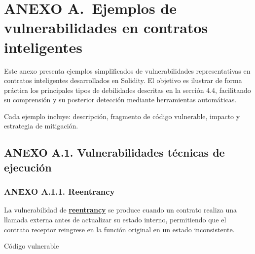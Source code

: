 \section{ANEXO A.~Ejemplos de vulnerabilidades en contratos
inteligentes}\label{anexo-a.-ejemplos-de-vulnerabilidades-en-contratos-inteligentes}

Este anexo presenta ejemplos simplificados de vulnerabilidades
representativas en contratos inteligentes desarrollados en Solidity. El
objetivo es ilustrar de forma práctica los principales tipos de
debilidades descritas en la sección 4.4, facilitando su comprensión y su
posterior detección mediante herramientas automáticas.

Cada ejemplo incluye: descripción, fragmento de código vulnerable,
impacto y estrategia de mitigación.

\subsection{ANEXO A.1. Vulnerabilidades técnicas de
ejecución}\label{anexo-a.1.-vulnerabilidades-tuxe9cnicas-de-ejecuciuxf3n}

\subsubsection{ANEXO A.1.1. Reentrancy}\label{anexo-a.1.1.-reentrancy}

La vulnerabilidad de
\href{https://www.cyfrin.io/blog/what-is-a-reentrancy-attack-solidity-smart-contracts}{\textbf{reentrancy}}
se produce cuando un contrato realiza una llamada externa antes de
actualizar su estado interno, permitiendo que el contrato receptor
reingrese en la función original en un estado inconsistente.

Código vulnerable

